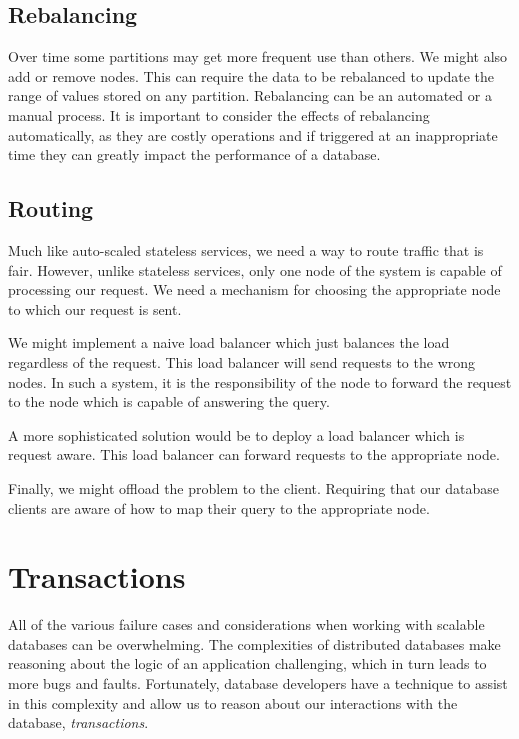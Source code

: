 \subsection{Rebalancing}

Over time some partitions may get more frequent use than others.
We might also add or remove nodes.
This can require the data to be rebalanced to update the range of values stored on any partition.
Rebalancing can be an automated or a manual process.
It is important to consider the effects of rebalancing automatically, as they are costly operations
and if triggered at an inappropriate time they can greatly impact the performance of a database.

\subsection{Routing}

Much like auto-scaled stateless services,
we need a way to route traffic that is fair.
However, unlike stateless services,
only one node of the system is capable of processing our request.
We need a mechanism for choosing the appropriate node to which our request is sent.

We might implement a naive load balancer which just balances the load regardless of the request.
This load balancer will send requests to the wrong nodes.
In such a system, it is the responsibility of the node to forward the request to the node which is capable of answering the query.

A more sophisticated solution would be to deploy a load balancer which is request aware.
This load balancer can forward requests to the appropriate node.

Finally, we might offload the problem to the client.
Requiring that our database clients are aware of how to map their query to the appropriate node.

\section{Transactions}

All of the various failure cases and considerations when working with scalable databases can be overwhelming.
The complexities of distributed databases make reasoning about the logic of an application challenging,
which in turn leads to more bugs and faults.
Fortunately, database developers have a technique to assist in this complexity and allow us to reason about our interactions with the database, \textsl{transactions}.

